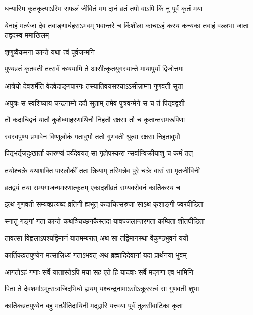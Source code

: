 \twolineshloka
{धन्यास्मि कृतकृत्याऽस्मि सफलं जीवितं मम}
{दानं व्रतं तपो वाऽपि किं नु पूर्वं कृतं मया} %

\threelineshloka
{येनाहं मर्त्यजा देव तवाङ्गार्धहराऽभवम्}
{भवान्तरे च किंशीला काचाऽहं कस्य कन्यका}
{तवाहं वल्लभा जाता तद्वदस्व ममाखिलम्} %



\onelineshloka
{शृणुष्वैकमना कान्ते यथा त्वं पूर्वजन्मनि} %

\twolineshloka
{पुण्यव्रतं कृतवती तत्सर्वं कथयामि ते}
{आसीत्कृतयुगस्यान्ते मायापुर्यां द्विजोत्तमः} %

\twolineshloka
{आत्रेयो देवशर्मेति वेदवेदाङ्गपारगः}
{तस्यातिवयसश्चाऽऽसीन्नाम्ना गुणवती सुता} %

\twolineshloka
{अपुत्रः स स्वशिष्याय चन्द्रनाम्ने ददौ सुताम्}
{तमेव पुत्रवन्मेने स च तं पितृवद्वशी} %

\twolineshloka
{तौ कदाचिद्वनं यातौ कुशेध्माहरणार्थिनौ}
{निहतौ रक्षसा तौ च कृतान्तसमरूपिणा} %

\twolineshloka
{स्वस्वपुण्य प्रभावेन विष्णुलोकं गतावुभौ}
{ततो गुणवती श्रुत्वा रक्षसा निहतावुभौ} %

\twolineshloka
{पितृभर्तृजदुःखार्ता कारुण्यं पर्यदेवयत्}
{सा गृहोपस्करा न्सर्वान्विक्रीयाशु च कर्मं तत्} %

\twolineshloka
{तयोश्चक्रे यथाशक्ति पारलौकीं ततः क्रियाम्}
{तस्मिन्नेव पुरे चक्रे वासं सा मृतजीविनी} %

\twolineshloka
{व्रतद्वयं तया सम्यगाजन्ममरणात्कृतम्}
{एकादशीव्रतं सम्यक्सेवनं कार्तिकस्य च} %

\twolineshloka
{इत्थं गुणवती सम्यक्प्रत्यब्द व्रतिनी ह्यभूत्}
{कदाचित्सरुजा साऽथ कृशाङ्गी ज्वरपीडिता} %

\twolineshloka
{स्नातुं गङ्गां गता कान्ते कथञ्चिच्छनकैस्तदा}
{यावज्जलान्तरगता कम्पिता शीतपीडिता} %

\twolineshloka
{तावत्सा विह्वलाऽपश्यद्विमानं यातमम्बरात्}
{अथ सा तद्विमानस्था वैकुण्ठभुवनं ययौ} %

\twolineshloka
{कार्तिकव्रतपुण्येन मत्सान्निध्यं गताऽभवत्}
{अथ ब्रह्मादिदेवानां यदा प्रार्थनया भुवम्} %

\twolineshloka
{आगतोऽहं गणाः सर्वे यातास्तेऽपि मया सह}
{एते हि यादवाः सर्वे मद्गणा एव भामिनि} %

\twolineshloka
{पिता ते देवशर्माऽभूत्सत्राजिदभिधो ह्ययम्}
{यश्चन्द्रनामाऽसोऽक्रूरस्त्वं सा गुणवती शुभा} %

\twolineshloka
{कार्तिकव्रतपुण्येन बहु मत्प्रीतिदायिनी}
{मद्द्वारि यत्त्वया पूर्वं तुलसीवाटिका कृता} %

